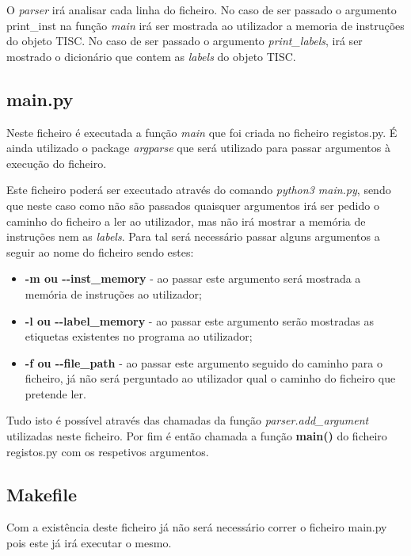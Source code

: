 \documentclass[titlepage,11pt,svgnames]{article}   %
\begin{document}
O \textit{parser} irá analisar cada linha do ficheiro. No caso de ser passado o argumento print\_inst na função \textit{main} irá ser mostrada ao utilizador a memoria de instruções do objeto TISC. No caso de ser passado o argumento \textit{print\_labels}, irá ser mostrado o dicionário que contem as \textit{labels} do objeto TISC.

\subsection{main.py}

Neste ficheiro é executada a função \textit{main} que foi criada no ficheiro registos.py. É ainda utilizado o package \textit{argparse} que será utilizado para passar argumentos à execução do ficheiro.

Este ficheiro poderá ser executado através do comando \textit{python3 main.py}, sendo que neste caso como não são passados quaisquer argumentos irá ser pedido o caminho do ficheiro a ler ao utilizador, mas não irá mostrar a memória de instruções nem as \textit{labels}. Para tal será necessário passar alguns argumentos a seguir ao nome do ficheiro sendo estes:

\begin{itemize}
\item \textbf{-m \textnormal{ou} -{}-inst\_memory} - ao passar este argumento será mostrada a memória de instruções ao utilizador;
\item \textbf{-l \textnormal{ou} -{}-label\_memory} - ao passar este argumento serão mostradas as etiquetas existentes no programa ao utilizador;
\item \textbf{-f \textnormal{ou} -{}-file\_path} - ao passar este argumento seguido do caminho para o ficheiro, já não será perguntado ao utilizador qual o caminho do ficheiro que pretende ler.
\end{itemize}

Tudo isto é possível através das chamadas da função \textit{parser.add\_argument} utilizadas neste ficheiro. Por fim é então chamada a função \textbf{main()} do ficheiro registos.py com os respetivos argumentos.

\subsection{Makefile}

Com a existência deste ficheiro já não será necessário correr o ficheiro main.py pois este já irá executar o mesmo.
\end{document}

